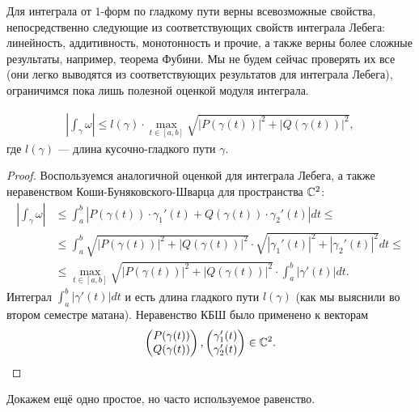\documentclass[../complex-analysis.tex]{subfiles}
\begin{document}
Для интеграла от $ 1 $-форм по гладкому пути верны всевозможные свойства, непосредственно следующие из соответствующих свойств интеграла Лебега: линейность, аддитивность, монотонность и прочие, а также верны более сложные результаты, например, теорема Фубини. Мы не будем сейчас проверять их все (они легко выводятся из соответствующих результатов для интеграла Лебега), ограничимся пока лишь полезной оценкой модуля интеграла.

\begin{lm}
 \begin{align}
  \label{eq:bound_on_absolute_value_of_int}
  \left| \int_{\gamma} \omega  \right| \leqslant l(\gamma) \cdot \max_{t \in [a,b]} \sqrt{\left| P(\gamma(t)) \right|^{2} + \left| Q(\gamma(t)) \right|^{2}},
 \end{align} где $l(\gamma)$ --- длина кусочно-гладкого пути $\gamma$.
\end{lm}
\begin{proof}
 Воспользуемся аналогичной оценкой для интеграла Лебега, а также неравенством Коши-Буняковского-Шварца для пространства $\mathbb{C}^{2}$:
 \begin{align*}
  \left| \int_{\gamma} \omega  \right| &\leqslant \int_{a}^{b} \left| P(\gamma(t))\cdot\gamma_1'(t) + Q(\gamma(t))\cdot\gamma_2'(t) \right|dt \leqslant \\
  &\leqslant \int_{a}^{b} \sqrt{\left| P(\gamma(t)) \right|^{2} + \left| Q(\gamma(t)) \right|^{2}} \cdot \sqrt{\left| \gamma_1'(t) \right|^{2} + \left| \gamma_2'(t) \right|^{2}} dt \leqslant \\
  &\leqslant \max_{t \in [a,b]} \sqrt{\left| P(\gamma(t)) \right|^{2} + \left| Q(\gamma(t)) \right|^{2}} \cdot \int_{a}^{b} \left| \gamma'(t) \right|  dt
 .\end{align*} Интеграл $\int_{a}^{b} \left| \gamma'(t) \right|dt$ и есть длина гладкого пути $l(\gamma)$ (как мы выяснили во втором семестре матана). Неравенство КБШ было применено к векторам
 \begin{align*}
  \begin{pmatrix}
   P(\gamma(t)) \\ Q(\gamma(t))
   \end{pmatrix}, \begin{pmatrix}
   \gamma_1'(t) \\ \gamma_2'(t)
  \end{pmatrix} \in \mathbb{C}^{2}.
 \end{align*}
\end{proof}

Докажем ещё одно простое, но часто используемое равенство.
\end{document}
